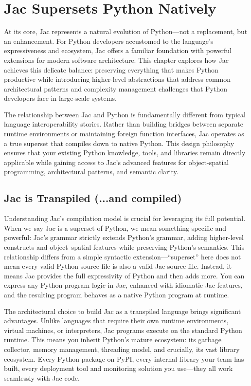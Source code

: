 \chapter{Jac Supersets Python Natively}

At its core, Jac represents a natural evolution of Python—not a replacement, but an enhancement. For Python developers accustomed to the language's expressiveness and ecosystem, Jac offers a familiar foundation with powerful extensions for modern software architecture. This chapter explores how Jac achieves this delicate balance: preserving everything that makes Python productive while introducing higher-level abstractions that address common architectural patterns and complexity management challenges that Python developers face in large-scale systems.

The relationship between Jac and Python is fundamentally different from typical language interoperability stories. Rather than building bridges between separate runtime environments or maintaining foreign function interfaces, Jac operates as a true superset that compiles down to native Python. This design philosophy ensures that your existing Python knowledge, tools, and libraries remain directly applicable while gaining access to Jac's advanced features for object-spatial programming, architectural patterns, and semantic clarity.

\section{Jac is Transpiled (...and compiled)}

Understanding Jac's compilation model is crucial for leveraging its full potential. When we say Jac is a superset of Python, we mean something specific and powerful: Jac's grammar strictly extends Python's grammar, adding higher-level constructs and object–spatial features while preserving Python's semantics. This relationship differs from a simple syntactic extension—``superset'' here does not mean every valid Python source file is also a valid Jac source file. Instead, it means Jac provides the full expressivity of Python and then adds more. You can express any Python program logic in Jac, enhanced with idiomatic Jac features, and the resulting program behaves as a native Python program at runtime.

The architectural choice to build Jac as a transpiled language brings significant advantages. Unlike languages that require their own runtime environments, virtual machines, or interpreters, Jac programs execute on the standard Python runtime. This means you inherit Python's mature ecosystem: its garbage collector, memory management, threading model, and crucially, its vast library ecosystem. Every Python package on PyPI, every internal library your team has built, every deployment tool and monitoring solution you use—they all work seamlessly with Jac code.

